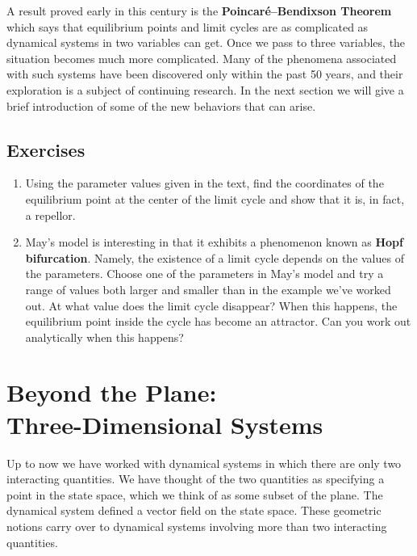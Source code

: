 A result proved early in this century is the {\bf
  Poincar\'{e}--Bendixson Theorem}  which says that equilibrium points and limit cycles are as
complicated as dynamical systems in two variables can get.  Once we
pass to three variables, the situation becomes much more complicated.
Many of the phenomena associated with such systems have been
discovered only within the past 50 years, and their exploration is a
subject of continuing research.  In the next section we will give a
brief introduction of some of the new behaviors that can arise.


\subsection{Exercises}
\label{subsec:exercises}


\begin{enumerate}
\item Using the parameter values given in the text, find the
coordinates of the equilibrium point at the center of the limit cycle
and show that it is, in fact, a repellor.


\item May's model is interesting in that it exhibits a phenomenon known
as {\bf Hopf bifurcation}. Namely, the
existence of a limit cycle depends on the values of the parameters.
Choose one of the parameters in May's model and try a range of values
both larger and smaller than in the example we've worked out. At what
value does the limit cycle disappear?  When this happens, the
equilibrium point inside the cycle has become an attractor.  Can you
work out analytically when this happens?


\end{enumerate}
\section{Beyond the Plane:\\ Three-Dimensional Systems}
\label{sec:beyond-the-plane-three-dimensional-systems}

Up to now we have worked with dynamical systems in which there are
only two interacting quantities.  We have thought of the two
quantities as specifying a point in the state space, which we think of
as some subset of the plane. The dynamical system defined a vector
field on the state space.  These geometric notions carry over to
dynamical systems involving more than two interacting quantities.

